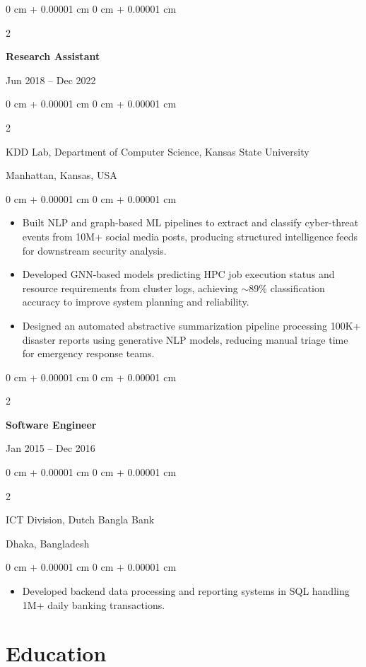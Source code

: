 \documentclass[10pt, letterpaper]{article}
\newenvironment{highlights}{
    \begin{itemize}[
        topsep=0.10 cm,
        parsep=0.10 cm,
        partopsep=0pt,
        itemsep=0pt,
        leftmargin=0 cm + 10pt
    ]
}{
    \end{itemize}
} %
\newenvironment{onecolentry}{
    \begin{adjustwidth}{
        0 cm + 0.00001 cm
    }{
        0 cm + 0.00001 cm
    }
}{
    \end{adjustwidth}
} %
\newenvironment{twocolentry}[2][]{
    \onecolentry
    \def\secondColumn{#2}
    \setcolumnwidth{\fill, 4.5 cm}
    \begin{paracol}{2}
}{
    \switchcolumn \raggedleft \secondColumn
    \end{paracol}
    \endonecolentry
} %
\begin{document}
    \vspace{1mm}

    \begin{twocolentry}{Jun 2018 -- Dec 2022}
        \textbf{Research Assistant}
    \end{twocolentry}
    \begin{twocolentry}{Manhattan, Kansas, USA}
       KDD Lab, Department of Computer Science, Kansas State University
    \end{twocolentry}
    \vspace{0.10 cm}
    \begin{onecolentry}
        \begin{highlights}
            \item Built NLP and graph-based ML pipelines to extract and classify cyber-threat events from 10M+ social media posts, producing structured intelligence feeds for downstream security analysis.
            \item Developed GNN-based models predicting HPC job execution status and resource requirements from cluster logs, achieving $\sim$89\% classification accuracy to improve system planning and reliability.
            \item Designed an automated abstractive summarization pipeline processing 100K+ disaster reports using generative NLP models, reducing manual triage time for emergency response teams.
        \end{highlights}
    \end{onecolentry}

    \vspace{0.1 cm}
    \begin{twocolentry}{Jan 2015 -- Dec 2016}
        \textbf{Software Engineer}
    \end{twocolentry}
    \begin{twocolentry}{Dhaka, Bangladesh}
       ICT Division, Dutch Bangla Bank
    \end{twocolentry}

    \begin{onecolentry}
        \begin{highlights}
            \item Developed backend data processing and reporting systems in SQL handling 1M+ daily banking transactions.
        \end{highlights}
    \end{onecolentry}

\section{Education}
\end{document}
